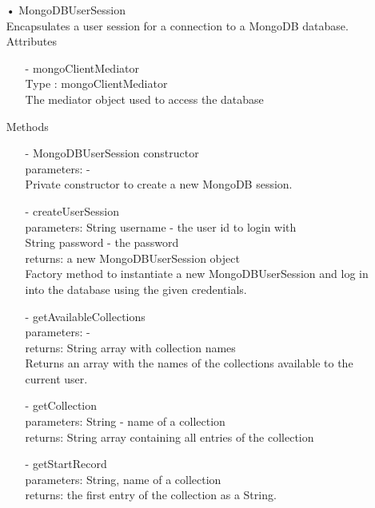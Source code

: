 \documentclass[oneside, english, final]{design}
\begin{document}
\begin{itemize}
	\newpage
	\item[•]MongoDBUserSession
	      \\Encapsulates a user session for a connection to a MongoDB database.
	      \\Attributes
	      \begin{itemize}
		      \item[-]mongoClientMediator
		            \\Type : mongoClientMediator
		            \\The mediator object used to access the database
	      \end{itemize}
	      Methods
	      \begin{itemize}
		      \item[-]MongoDBUserSession constructor
		            \\parameters: -
		            \\Private constructor to create a new MongoDB session.

		      \item[-]createUserSession
		            \\parameters: String username - the user id to login with
		            \\String password - the password
		            \\returns: a new MongoDBUserSession object
		            \\Factory method to instantiate a new MongoDBUserSession and log in into the database using the given credentials.

		      \item[-]getAvailableCollections
		            \\parameters: -
		            \\returns: String array with collection names
		            \\Returns an array with the names of the collections available to the current user.

		      \item[-]getCollection
		            \\parameters: String - name of a collection
		            \\returns: String array containing all entries of the collection

		      \item[-]getStartRecord
		            \\parameters: String, name of a collection
		            \\returns: the first entry of the collection as a String.


\end{itemize}
\end{itemize}
\end{document}
